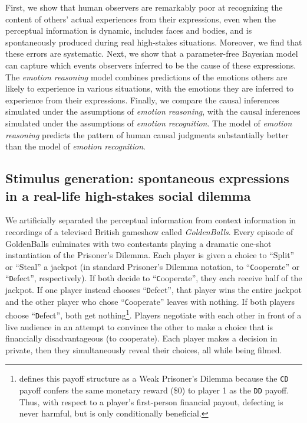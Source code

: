 \documentclass[10pt,letterpaper]{article}
\newcommand{\C}{\texttt{C}\xspace}
\newcommand{\D}{\texttt{D}\xspace}
\newcommand{\CD}{\texttt{CD}\xspace}
\newcommand{\DD}{\texttt{DD}\xspace}
\begin{document}
First, we show that human observers are remarkably poor at recognizing the content of others' actual experiences from their expressions, even when the perceptual information is dynamic, includes faces and bodies, and is spontaneously produced during real high-stakes situations. 
Moreover, we find that these errors are systematic.
Next, we show that a parameter-free Bayesian model can capture which events observers inferred to be the cause of these expressions. The {\em emotion reasoning} model combines predictions of the emotions others are likely to experience in various situations, with the emotions they are inferred to experience from their expressions.
Finally, we compare the causal inferences simulated under the assumptions of {\em emotion reasoning}, with the causal inferences simulated under the assumptions of {\em emotion recognition}. The model of {\em emotion reasoning} predicts the pattern of human causal judgments substantially better than the model of {\em emotion recognition}.





\subsection{Stimulus generation: spontaneous expressions in a real-life high-stakes social dilemma}

We artificially separated the perceptual information from context information in recordings of a televised British gameshow called {\em GoldenBalls}.
Every episode of GoldenBalls culminates with two contestants playing a dramatic one-shot instantiation of the Prisoner's Dilemma. Each player is given a choice to ``Split'' or ``Steal'' a jackpot (in standard Prisoner's Dilemma notation, to ``\C{}ooperate'' or ``\D{}efect'', respectively). If both decide to ``\C{}ooperate'', they each receive half of the jackpot. 
If one player instead chooses ``\D{}efect'', that player wins the entire jackpot and the other player who chose ``\C{}ooperate'' leaves with nothing. If both players choose ``\D{}efect'', both get nothing\footnote{\citet{rapoport1988weakpd} defines this payoff structure as a Weak Prisoner's Dilemma because the \CD payoff confers the same monetary reward (\$0) to player 1 as the \DD payoff. Thus, with respect to a player's first-person financial payout, defecting is never harmful, but is only conditionally beneficial.}. 
Players negotiate with each other in front of a live audience in an attempt to convince the other to make a choice that is financially disadvantageous (to cooperate). Each player makes a decision in private, then they simultaneously reveal their choices, all while being filmed.
\end{document}
